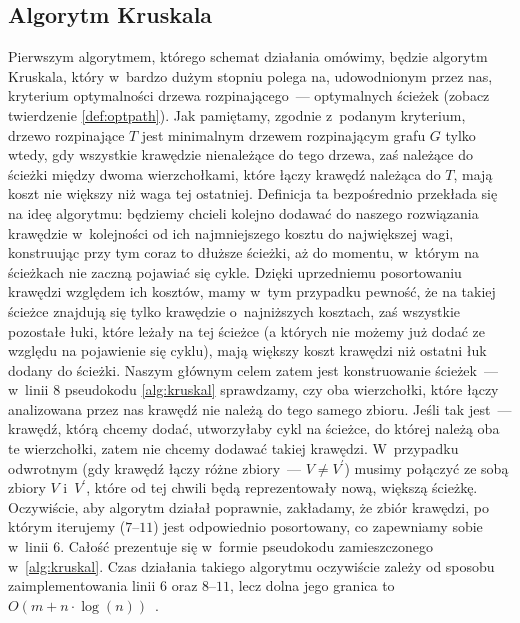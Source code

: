 \subsection{Algorytm Kruskala}



Pierwszym algorytmem, którego schemat działania omówimy, będzie algorytm Kruskala, który w~bardzo dużym stopniu polega na, udowodnionym przez nas, kryterium optymalności drzewa rozpinającego~--- optymalnych ścieżek (zobacz twierdzenie \ref{def:optpath}).
Jak pamiętamy, zgodnie z~podanym kryterium, drzewo rozpinające $T$ jest minimalnym drzewem rozpinającym grafu $G$ tylko wtedy, gdy wszystkie krawędzie nienależące do tego drzewa, zaś należące do ścieżki między dwoma wierzchołkami, które łączy krawędź należąca do $T$, mają koszt nie większy niż waga tej ostatniej.
Definicja ta bezpośrednio przekłada się na ideę algorytmu: będziemy chcieli kolejno dodawać do naszego rozwiązania krawędzie w~kolejności od ich najmniejszego kosztu do największej wagi, konstruując przy tym coraz to dłuższe ścieżki, aż do momentu, w~którym na ścieżkach nie zaczną pojawiać się cykle.
Dzięki uprzedniemu posortowaniu krawędzi względem ich kosztów, mamy w~tym przypadku pewność, że na takiej ścieżce znajdują się tylko krawędzie o~najniższych kosztach, zaś wszystkie pozostałe łuki, które leżały na tej ścieżce (a których nie możemy już dodać ze względu na pojawienie się cyklu), mają większy koszt krawędzi niż ostatni łuk dodany do ścieżki.
Naszym głównym celem zatem jest konstruowanie ścieżek~--- w~linii $8$ pseudokodu \ref{alg:kruskal} sprawdzamy, czy oba wierzchołki, które łączy analizowana przez nas krawędź nie należą do tego samego zbioru.
Jeśli tak jest~--- krawędź, którą chcemy dodać, utworzyłaby cykl na ścieżce, do której należą oba te wierzchołki, zatem nie chcemy dodawać takiej krawędzi.
W~przypadku odwrotnym (gdy krawędź łączy różne zbiory~--- $V \neq V^{\prime}$) musimy połączyć ze sobą zbiory $V$ i~$V^{\prime}$, które od tej chwili będą reprezentowały nową, większą ścieżkę.
Oczywiście, aby algorytm działał poprawnie, zakładamy, że zbiór krawędzi, po którym iterujemy ($7$--$11$) jest odpowiednio posortowany, co zapewniamy sobie w~linii $6$.
Całość prezentuje się w~formie pseudokodu zamieszczonego w~\ref{alg:kruskal}.
Czas działania takiego algorytmu oczywiście zależy od sposobu zaimplementowania linii $6$ oraz $8$--$11$, lecz dolna jego granica to $O \left( m + n \cdot \log \left( n \right) \right)$~\cite[$522$]{Ahuja:1993:NFT:137406}.

